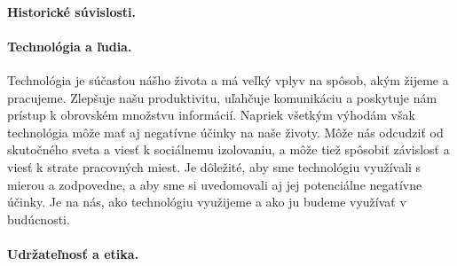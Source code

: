 \documentclass[10pt,oneside,slovak,a4paper]{article}
\begin{document}
\paragraph{Historické súvislosti.}



 \paragraph{Technológia a ľudia.}

Technológia je súčasťou nášho života a má veľký vplyv na spôsob, akým žijeme a pracujeme. Zlepšuje našu produktivitu, uľahčuje komunikáciu a poskytuje nám prístup k obrovském množstvu informácií. Napriek všetkým výhodám však technológia môže mať aj negatívne účinky na naše životy. Môže nás odcudziť od skutočného sveta a viesť k sociálnemu izolovaniu, a môže tiež spôsobiť závislosť a viesť k strate pracovných miest. Je dôležité, aby sme technológiu využívali s mierou a zodpovedne, a aby sme si uvedomovali aj jej potenciálne negatívne účinky. Je na nás, ako technológiu využijeme a ako ju budeme využívať v budúcnosti.

\paragraph{Udržateľnosť a etika.}








\end{document}
